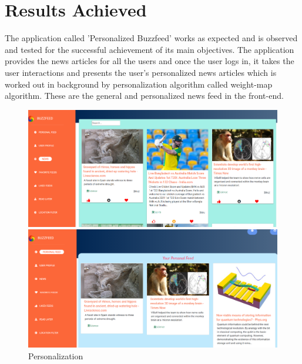 \section{Results Achieved}
The application called 'Personalized Buzzfeed' works as expected and is observed and tested for the successful achievement of its main objectives. 
The application provides the news articles for all the users and once the user logs in, it takes the user interactions and presents the user's personalized news articles which is worked out in background by personalization algorithm called weight-map algorithm.
These are the general and personalized news feed in the front-end.
 \begin{figure}[h!]
    \begin{multicols}{2}
    \includegraphics[width=\linewidth]{images/NewsFeed.PNG}\par 
    \includegraphics[width=\linewidth]{images/userFeed.PNG}\par 
    \end{multicols}

\centering \caption{Personalization}
\end{figure}

